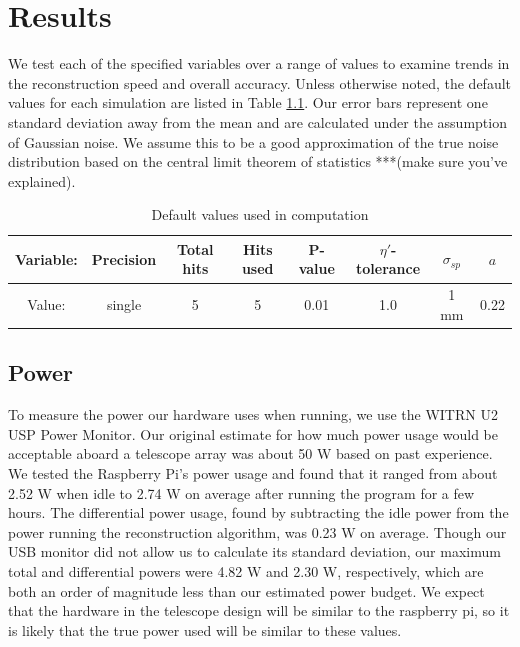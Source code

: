 \chapter{Results}
We test each of the specified variables over a range of values to examine trends in the reconstruction speed and overall accuracy. Unless otherwise noted, the default values for each simulation are listed in Table \ref{tab:def_vals}. Our error bars represent one standard deviation away from the mean and are calculated under the assumption of Gaussian noise. We assume this to be a good approximation of the true noise distribution based on the central limit theorem of statistics ***(make sure you've explained).\\

\begin{table}[h]
    \centering
    \begin{tabular}{|c|c|c|c|c|c|c|c|}
    \hline
    Variable: & Precision & Total hits & Hits used & P-value & $\eta'$-tolerance & $\sigma_{sp}$ & $a$ \\
    \hline
    Value: & single & 5 & 5 & 0.01 & 1.0 & 1 mm & 0.22 \\
    \hline
    \end{tabular}
    \caption{Default values used in computation}
    \label{tab:def_vals}
\end{table}

\section{Power}
To measure the power our hardware uses when running, we use the WITRN U2 USP Power Monitor\cite{WITRN}. Our original estimate for how much power usage would be acceptable aboard a telescope array was about 50 W based on past experience. We tested the Raspberry Pi's power usage and found that it ranged from about 2.52 W when idle to 2.74 W on average after running the program for a few hours. The differential power usage, found by subtracting the idle power from the power running the reconstruction algorithm, was 0.23 W on average. Though our USB monitor did not allow us to calculate its standard deviation, our maximum total and differential powers were 4.82 W and 2.30 W, respectively, which are both an order of magnitude less than our estimated power budget. We expect that the hardware in the telescope design will be similar to the raspberry pi, so it is likely that the true power used will be similar to these values.

